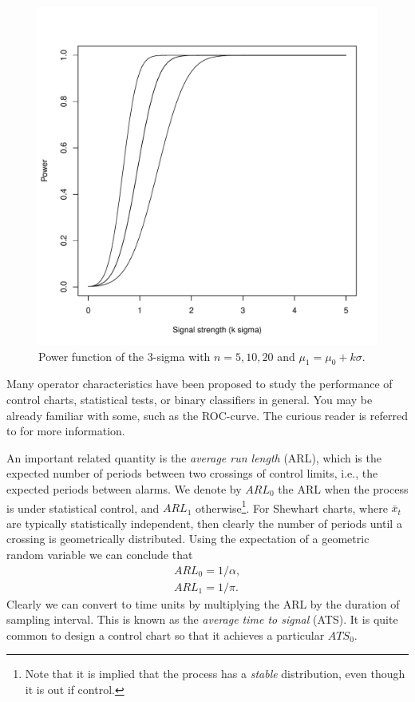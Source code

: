 \begin{figure}[h]
\centering
\includegraphics[height=0.3\textheight]{art/power_function.pdf}
\caption[Power Function]{Power function of the 3-sigma \barxChart with $n=5,10,20$ and $\mu_1=\mu_0 + k \sigma$.}
\label{fig:power_function}
\end{figure}

\begin{extra}
Many operator characteristics have been proposed to study the performance of control charts, statistical tests, or binary classifiers in general.
You may be already familiar with some, such as the ROC-curve. 
The curious reader is referred to \cite{wikipedia_receiver_2015} for more information.
\end{extra}


An important related quantity is the \emph{average run length} (ARL), which is the expected number of periods between two crossings of control limits, i.e., the expected periods between alarms. 
We denote by $ARL_0$ the ARL when the process is under statistical control, and $ARL_1$ otherwise\footnote{Note that it is implied that the process has a \emph{stable} distribution, even though it is out if control.}. 
For Shewhart charts, where $\bar{x}_t$ are typically statistically independent, then clearly the number of periods until a crossing is geometrically distributed. Using the expectation of a geometric random variable we can conclude that 
\begin{align}
	ARL_0=1/\alpha \label{eq:arl_0}, \\
	ARL_1=1/\pi \label{eq:arl_1}.
\end{align}
Clearly we can convert to time units by multiplying the ARL by the duration of sampling interval.
This is known as the \emph{average time to signal} (ATS).
It is quite common to design a control chart so that it achieves a particular $ATS_0$.

